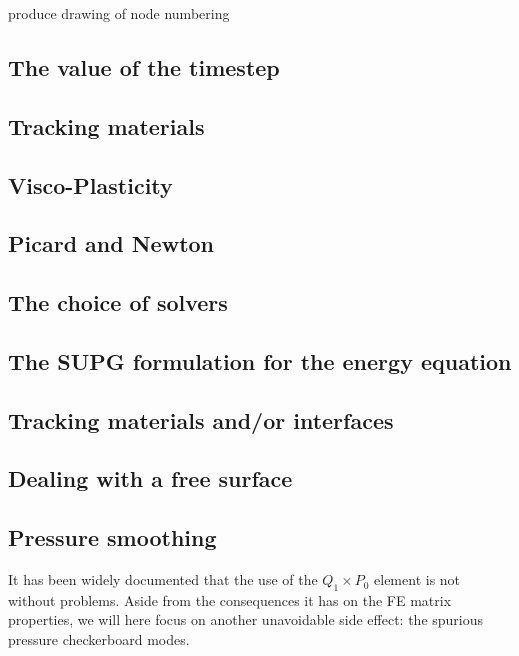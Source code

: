 \documentclass[a4paper]{article}
\begin{document}
{\color{red} produce drawing of node numbering}


\newpage
\subsection{The value of the timestep}

\subsection{Tracking materials}

\subsection{Visco-Plasticity}

\subsection{Picard and Newton}

\subsection{The choice of solvers}

\subsection{The SUPG formulation for the energy equation}

\subsection{Tracking materials and/or interfaces}

\subsection{Dealing with a free surface}



\newpage
\subsection{Pressure smoothing}

It has been widely documented that the use of the $Q_1 \times P_0$ element is not without problems. Aside from the 
consequences it has on the FE matrix properties, we will here focus on another unavoidable side effect: the spurious pressure 
checkerboard modes.  
\end{document}
